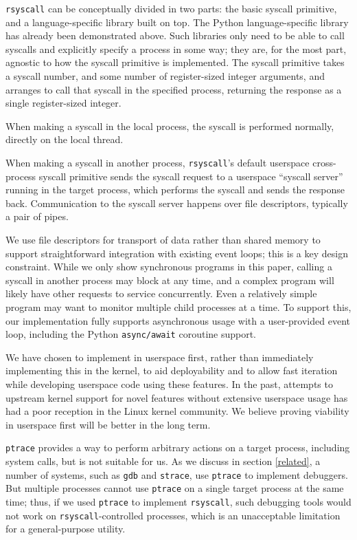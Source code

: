 \documentclass[letterpaper,twocolumn,10pt]{article}
\begin{document}
\texttt{rsyscall} can be conceptually divided in two parts:
the basic syscall primitive,
and a language-specific library built on top.
The Python language-specific library has already been demonstrated above.
Such libraries only need to be able to call syscalls and explicitly specify a process in some way;
they are, for the most part, agnostic to how the syscall primitive is implemented.
The syscall primitive takes a syscall number, and some number of register-sized integer arguments,
and arranges to call that syscall in the specified process,
returning the response as a single register-sized integer.

When making a syscall in the local process, the syscall is performed normally,
directly on the local thread.

When making a syscall in another process,
\texttt{rsyscall}'s default userspace cross-process syscall primitive sends the syscall request
to a userspace ``syscall server'' running in the target process,
which performs the syscall and sends the response back.
Communication to the syscall server happens over file descriptors,
typically a pair of pipes.

We use file descriptors for transport of data rather than shared memory
to support straightforward integration with existing event loops;
this is a key design constraint.
While we only show synchronous programs in this paper,
calling a syscall in another process may block at any time,
and a complex program will likely have other requests to service concurrently.
Even a relatively simple program may want to monitor multiple child processes at a time.
To support this,
our implementation fully supports asynchronous usage with a user-provided event loop,
including the Python \texttt{async/await} coroutine support.\cite{python_coroutines}

We have chosen to implement in userspace first,
rather than immediately implementing this in the kernel,
to aid deployability
and to allow fast iteration while developing userspace code using these features.
In the past, attempts to upstream kernel support for novel features without extensive userspace usage
has had a poor reception in the Linux kernel community.\cite{lwn_checkpoint}\cite{first_class_address_space}
We believe proving viability in userspace first will be better in the long term.

\texttt{ptrace} provides a way to perform arbitrary actions on a target process,
including system calls,
but is not suitable for us.\cite{ptrace}
As we discuss in section \ref{related}, a number of systems, such as \texttt{gdb} and \texttt{strace},
use \texttt{ptrace} to implement debuggers.
But multiple processes cannot use \texttt{ptrace} on a single target process at the same time;
thus, if we used \texttt{ptrace} to implement \texttt{rsyscall},
such debugging tools would not work on \texttt{rsyscall}-controlled processes,
which is an unacceptable limitation for a general-purpose utility.
\end{document}

